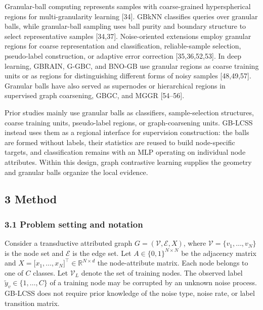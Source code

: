 Granular-ball computing represents samples with coarse-grained hyperspherical regions for multi-granularity learning {[}34{]}. GBkNN classifies queries over granular balls, while granular-ball sampling uses ball purity and boundary structure to select representative samples {[}34,37{]}. Noise-oriented extensions employ granular regions for coarse representation and classification, reliable-sample selection, pseudo-label construction, or adaptive error correction {[}35,36,52,53{]}. In deep learning, GBRAIN, G-GBC, and BNO-GB use granular regions as coarse training units or as regions for distinguishing different forms of noisy samples {[}48,49,57{]}. Granular balls have also served as supernodes or hierarchical regions in supervised graph coarsening, GBGC, and MGGR {[}54--56{]}.

Prior studies mainly use granular balls as classifiers, sample-selection structures, coarse training units, pseudo-label regions, or graph-coarsening units. GB-LCSS instead uses them as a regional interface for supervision construction: the balls are formed without labels, their statistics are reused to build node-specific targets, and classification remains with an MLP operating on individual node attributes. Within this design, graph contrastive learning supplies the geometry and granular balls organize the local evidence.

\subsection{3 Method}\label{method}

\subsubsection{3.1 Problem setting and notation}\label{problem-setting-and-notation}

Consider a transductive attributed graph \(G = (\mathcal{V},\mathcal{E},X)\), where \(\mathcal{V} = \{ v_{1},\ldots,v_{N}\}\) is the node set and \(\mathcal{E}\) is the edge set. Let \(A \in \{ 0,1\}^{N \times N}\) be the adjacency matrix and \(X = \lbrack x_{1},\ldots,x_{N}\rbrack^{\top} \in \mathbb{R}^{N \times d}\) the node-attribute matrix. Each node belongs to one of \(C\) classes. Let \(\mathcal{V}_{L}\) denote the set of training nodes. The observed label \({\widetilde{y}}_{v} \in \{ 1,\ldots,C\}\) of a training node may be corrupted by an unknown noise process. GB-LCSS does not require prior knowledge of the noise type, noise rate, or label transition matrix.


